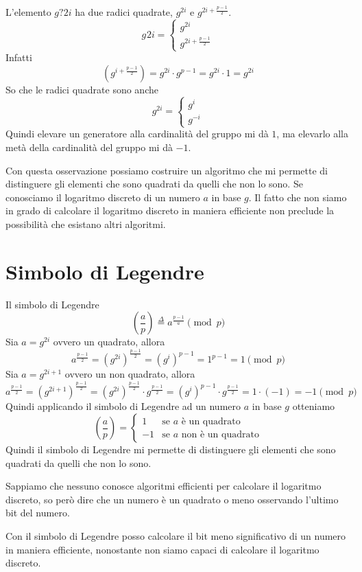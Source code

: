 L'elemento $g?{2i}$ ha due radici quadrate, $g^{2i}$ e $g^{2i + \frac{p-1}{2}}$.
\[
  g^{}2i =
\begin{cases}
  g^{2i} \\
  g^{2i + \frac{p-1}{2}} 
\end{cases}
\]
Infatti
\[
  \left( g^{i + \frac{p-1}{2}}\right) = g^{2i}\cdot g^{p-1} = g^{2i} \cdot 1 = g^{2i}
\]
So che le radici quadrate sono anche 
\[
g^{2i} = 
\begin{cases}
  g^{i} \\
  g^{-i}
\end{cases}
\]
Quindi elevare un generatore alla cardinalità del gruppo mi dà $1$, ma 
elevarlo alla metà della cardinalità del gruppo mi dà $-1$.

Con questa osservazione possiamo costruire un algoritmo che mi permette di
distinguere gli elementi che sono quadrati da quelli che non lo sono.
Se conosciamo il logaritmo discreto di un numero $a$ in base $g$. Il fatto 
che non siamo in grado di calcolare il logaritmo discreto in maniera efficiente
non preclude la possibilità che esistano altri algoritmi. 

\section{Simbolo di Legendre}
Il simbolo di Legendre
\[
  \left(\frac{a}{p}\right) \stackrel{\Delta}{=}
  a^{\frac{p-1}{a}} \pmod p
\]
Sia $a = g^{2i}$ ovvero un quadrato, allora
\[
  a^{\frac{p-1}{2}}= (g^{2i})^{\frac{p-1}{2}} = (g^{i})^{p-1} = 
  1^{p-1} = 1 \pmod p
\]
Sia $a = g^{2i + 1}$ ovvero un non quadrato, allora
\[
  a^{\frac{p-1}{2}}= (g^{2i + 1})^{\frac{p-1}{2}} = (g^{2i})^{\frac{p-1}{2}}
  \cdot g^{\frac{p-1}{2}} = (g^{i})^{p-1} \cdot g^{\frac{p-1}{2}} = 
  1 \cdot (-1) = -1 \pmod p
\]
Quindi applicando il simbolo di Legendre ad un numero $a$ in base $g$ otteniamo
\[
  \left(\frac{a}{p}\right) = 
  \begin{cases}
    1 & \text{se $a$ è un quadrato} \\
    -1 & \text{se $a$ non è un quadrato}
  \end{cases}
\]
Quindi il simbolo di Legendre mi permette di distinguere gli elementi che sono
quadrati da quelli che non lo sono.

Sappiamo che nessuno conosce algoritmi efficienti per calcolare il
logaritmo discreto, so però dire che un numero è un quadrato o meno osservando 
l'ultimo bit del numero.

Con il simbolo di Legendre posso calcolare il bit meno significativo di un numero
in maniera efficiente, nonostante non siamo capaci di calcolare il logaritmo 
discreto.

